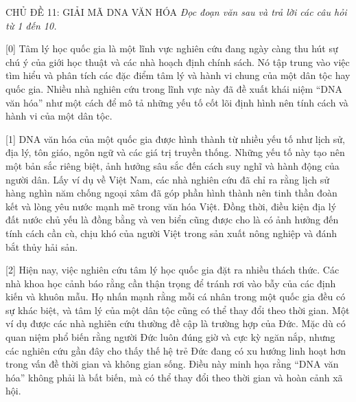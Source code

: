 \documentclass[12pt,a4paper,twoside]{article}
\newenvironment{readingpassage}[1][]{%
    \begin{tcolorbox}[enhanced, colback=grayLight, colframe=secondaryBlue,
        coltitle=textDark, fonttitle=\bfseries, title={#1},
        rounded corners, arc=3mm, boxrule=1pt,
        left=15pt, right=15pt, top=10pt, bottom=10pt,
        breakable, before skip=10pt, after skip=10pt, drop fuzzy shadow]
    \setstretch{1.3}
}{\end{tcolorbox}}
\begin{document}
\newpage
\label{a_cd11}
\begin{topicbox}{\large CHỦ ĐỀ 11: GIẢI MÃ DNA VĂN HÓA}
\vspace{8pt}
\textit{Đọc đoạn văn sau và trả lời các câu hỏi từ 1 đến 10.}
\vspace{6pt}
\end{topicbox}
\vspace{5pt}
\begin{readingpassage}[]
[0] Tâm lý học quốc gia là một lĩnh vực nghiên cứu đang ngày càng thu hút sự chú ý của giới học thuật và các nhà hoạch định chính sách. Nó tập trung vào việc tìm hiểu và phân tích các đặc điểm tâm lý và hành vi chung của một dân tộc hay quốc gia. Nhiều nhà nghiên cứu trong lĩnh vực này đã đề xuất khái niệm ``DNA văn hóa'' như một cách để mô tả những yếu tố cốt lõi định hình nên tính cách và hành vi của một dân tộc.

[1] DNA văn hóa của một quốc gia được hình thành từ nhiều yếu tố như lịch sử, địa lý, tôn giáo, ngôn ngữ và các giá trị truyền thống. Những yếu tố này tạo nên một bản sắc riêng biệt, ảnh hưởng sâu sắc đến cách suy nghĩ và hành động của người dân. Lấy ví dụ về Việt Nam, các nhà nghiên cứu đã chỉ ra rằng lịch sử hàng nghìn năm chống ngoại xâm đã góp phần hình thành nên tinh thần đoàn kết và lòng yêu nước mạnh mẽ trong văn hóa Việt. Đồng thời, điều kiện địa lý đất nước chủ yếu là đồng bằng và ven biển cũng được cho là có ảnh hưởng đến tính cách cần cù, chịu khó của người Việt trong sản xuất nông nghiệp và đánh bắt thủy hải sản.

[2] Hiện nay, việc nghiên cứu tâm lý học quốc gia đặt ra nhiều thách thức. Các nhà khoa học cảnh báo rằng cần thận trọng để tránh rơi vào bẫy của các định kiến và khuôn mẫu. Họ nhấn mạnh rằng mỗi cá nhân trong một quốc gia đều có sự khác biệt, và tâm lý của một dân tộc cũng có thể thay đổi theo thời gian. Một ví dụ được các nhà nghiên cứu thường đề cập là trường hợp của Đức. Mặc dù có quan niệm phổ biến rằng người Đức luôn đúng giờ và cực kỳ ngăn nắp, nhưng các nghiên cứu gần đây cho thấy thế hệ trẻ Đức đang có xu hướng linh hoạt hơn trong vấn đề thời gian và không gian sống. Điều này minh họa rằng ``DNA văn hóa'' không phải là bất biến, mà có thể thay đổi theo thời gian và hoàn cảnh xã hội.


\end{readingpassage}
\end{document}
